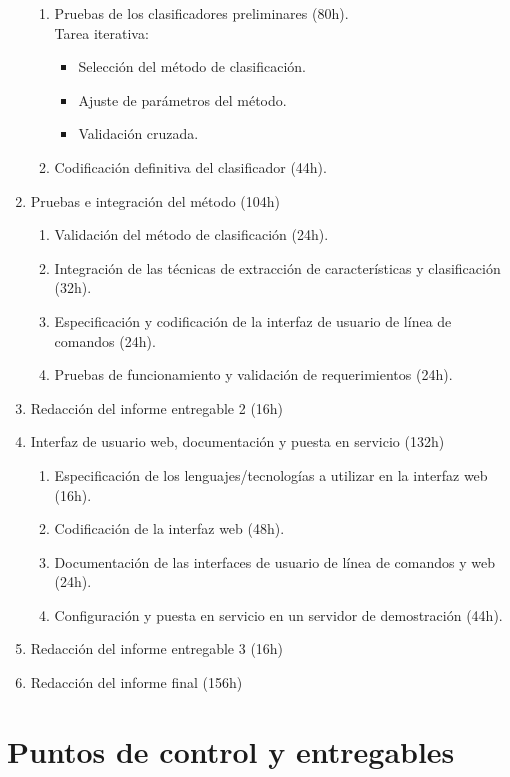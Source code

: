 \documentclass[12pt,bibliography=oldstyle,DIV=14,parskip=full-,titlepage]{scrartcl}
\begin{document}
\begin{enumerate}
\begin{enumerate}
  \item Pruebas de los clasificadores preliminares (80h).\\
    Tarea iterativa:
    \begin{itemize}
    \item Selección del método de clasificación.
    \item Ajuste de parámetros del método.
    \item Validación cruzada.
    \end{itemize}
  \item Codificación definitiva del clasificador (44h).
  \end{enumerate}
\item Pruebas e integración del método (104h)
  \begin{enumerate}
  \item Validación del método de clasificación (24h).
  \item Integración de las técnicas de extracción de características y
    clasificación (32h).
  \item Especificación y codificación de la interfaz de usuario de
    línea de comandos (24h).
  \item Pruebas de funcionamiento y validación de requerimientos (24h).
  \end{enumerate}
\item Redacción del informe entregable 2 (16h)
\item Interfaz de usuario web, documentación y puesta en servicio (132h)
  \begin{enumerate}
  \item Especificación de los lenguajes/tecnologías a utilizar en la
    interfaz web (16h).
  \item Codificación de la interfaz web (48h).
  \item Documentación de las interfaces de usuario de línea de
    comandos y web (24h).
  \item Configuración y puesta en servicio en un servidor de demostración
    (44h).
  \end{enumerate}
\item Redacción del informe entregable 3 (16h)
\item Redacción del informe final (156h)
\end{enumerate}
%
%
\section{Puntos de control y entregables}
\end{document}
